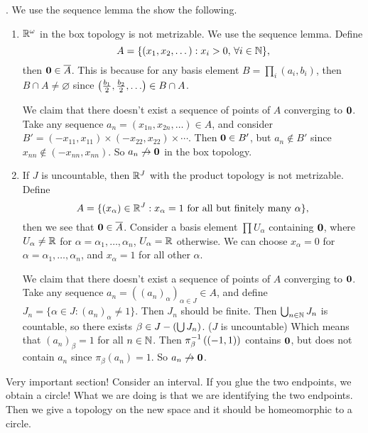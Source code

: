 \ex. We use the sequence lemma the show the following.
\begin{enumerate}
    \item \(\R^\omega\) in the box topology is not metrizable. We use the sequence lemma. Define
          \[
              A = \{(x_1, x_2, \dots) : x_i > 0, \,\forall i \in \N\},
          \]
          then \(\bf{0} \in \cl{A}\). This is because for any basis element \(B = \prod_{i} (a_i, b_i)\), then \(B \cap A \neq \varnothing\) since \(\paren{\frac{b_1}{2}, \frac{b_2}{2}, \dots} \in B \cap A\).

          We claim that there doesn't exist a sequence of points of \(A\) converging to \(\bf{0}\). Take any sequence \(a_n = (x_{1n}, x_{2n}, \dots) \in A\), and consider \(B' = (-x_{11}, x_{11}) \times (-x_{22}, x_{22}) \times \cdots\). Then \(\bf{0} \in B'\), but \(a_n \notin B'\) since \(x_{nn} \notin (-x_{nn}, x_{nn})\). So \(a_n \not\ra \bf{0}\) in the box topology.

    \item If \(J\) is uncountable, then \(\R^J\) with the product topology is not metrizable. Define
          \[
              A = \{(x_\alpha) \in \R^J : x_\alpha = 1 \text{ for all but finitely many } \alpha\},
          \]
          then we see that \(\bf{0} \in \cl{A}\). Consider a basis element \(\prod U_\alpha\) containing \(\bf{0}\), where \(U_\alpha \neq \R\) for \(\alpha = \alpha_1, \dots, \alpha_n\), \(U_\alpha = \R\) otherwise. We can choose \(x_\alpha = 0\) for \(\alpha = \alpha_1, \dots, \alpha_n\), and \(x_\alpha = 1\) for all other \(\alpha\).

          We claim that there doesn't exist a sequence of points of \(A\) converging to \(\bf{0}\). Take any sequence \(a_n = ((a_n)_\alpha)_{\alpha \in J} \in A\), and define \(J_n = \{\alpha \in J : (a_n)_\alpha \neq 1\}\). Then \(J_n\) should be finite. Then \(\bigcup_{n \in \N} J_n\) is countable, so there exists \(\beta \in J \bs \paren{\bigcup J_n}\). (\(J\) is uncountable) Which means that \((a_n)_\beta = 1\) for all \(n \in \N\). Then \(\pi_\beta\inv\paren{(-1, 1)}\) contains \(\bf{0}\), but does not contain \(a_n\) since \(\pi_\beta(a_n) = 1\). So \(a_n \not\ra \bf{0}\).
\end{enumerate}


Very important section! Consider an interval. If you glue the two endpoints, we obtain a circle! What we are doing is that we are identifying the two endpoints. Then we give a topology on the new space and it should be homeomorphic to a circle.

